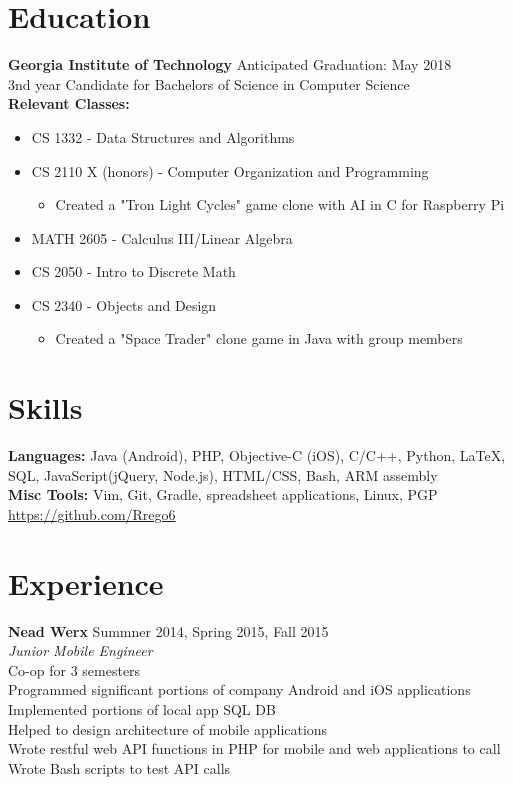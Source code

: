\documentclass[line, margin]{res}
\begin{document}

\address{402 Roberts Way \\ Rincon, GA 31326 \\ (912) 346 6060}

\begin{resume}

\section{Education}
\textbf{Georgia Institute of Technology} \hfill Anticipated Graduation: May 2018 \\
3nd year Candidate for Bachelors of Science in Computer Science \\
\textbf{Relevant Classes:}
\begin{itemize}
	\item CS 1332 - Data Structures and Algorithms
	\item CS 2110 X (honors) - Computer Organization and Programming
		\begin{itemize}
			\item Created a "Tron Light Cycles" game clone with AI in C for Raspberry Pi
		\end{itemize}
	\item MATH 2605 - Calculus III/Linear Algebra
	\item CS 2050 - Intro to Discrete Math
	\item CS 2340 - Objects and Design
		\begin{itemize}
			\item Created a "Space Trader" clone game in Java with group members
		\end{itemize}
\end{itemize}


\section{Skills}
\textbf{Languages:} Java (Android), PHP, Objective-C (iOS), C/C++, Python, LaTeX, SQL, JavaScript(jQuery, Node.js), HTML/CSS, Bash, ARM assembly \\
\textbf{Misc Tools:} Vim, Git, Gradle, spreadsheet applications, Linux, PGP \\
\url{https://github.com/Rrego6}

\section{Experience}
\textbf{Nead Werx} \hfill Summner 2014, Spring 2015, Fall 2015 \\
\textit{Junior Mobile Engineer} \\
Co-op for 3 semesters \\
Programmed significant portions of company Android and iOS applications \\
Implemented portions of local app SQL DB \\
Helped to design architecture of mobile applications\\
Wrote restful web API functions in PHP for mobile and web applications to call \\
Wrote Bash scripts to test API calls \\


\end{resume}
\end{document}
